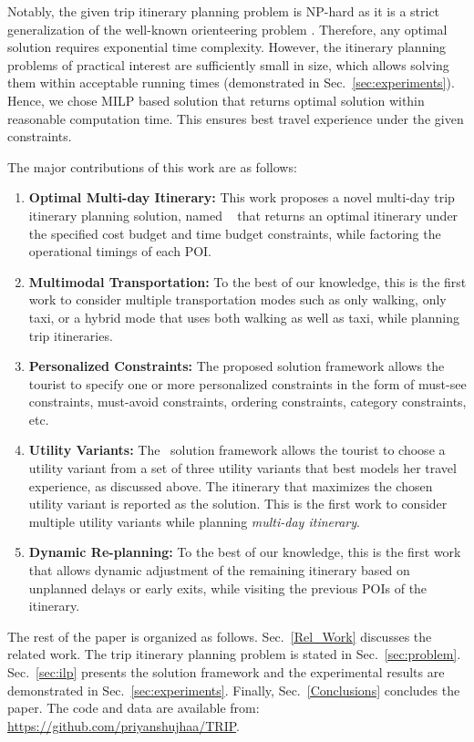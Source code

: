 Notably, the given trip itinerary planning problem is NP-hard as it is a strict generalization of the well-known orienteering problem \cite{vansteenwegen2011orienteering, gunawan2016orienteering, vansteenwegen2019orienteering}. Therefore, any optimal solution requires exponential time complexity. However, the itinerary planning problems of practical interest are sufficiently small in size, which allows solving them within acceptable running times (demonstrated in Sec.~\ref{sec:experiments}). Hence, we chose MILP based solution that returns optimal solution within reasonable computation time. This ensures best travel experience under the given constraints.

The major contributions of this work are as follows:

\begin{enumerate}
\item \textbf{Optimal Multi-day Itinerary:} This work proposes a novel multi-day trip itinerary planning solution, named \trip~ that returns an optimal itinerary under the specified cost budget and time budget constraints, while factoring the operational timings of each POI.  
\item \textbf{Multimodal Transportation:} To the best of our knowledge, this is the first work to consider multiple transportation modes such as only walking, only taxi, or a hybrid mode that uses both walking as well as taxi, while planning trip itineraries.
\item \textbf{Personalized Constraints:} The proposed solution framework allows the tourist to specify one or more personalized constraints in the form of must-see constraints, must-avoid constraints, ordering constraints, category constraints, etc.
\item \textbf{Utility Variants:} The \trip~solution framework allows the tourist to choose a utility variant from a set of three utility variants that best models her travel experience, as discussed above. The itinerary that maximizes the chosen utility variant is reported as the solution. This is the first work to consider multiple utility variants while planning \emph{multi-day itinerary}.
\item \textbf{Dynamic Re-planning:} To the best of our knowledge, this is the first work that allows dynamic adjustment of the remaining itinerary based on unplanned delays or early exits, while visiting the previous POIs of the itinerary.
%
\end{enumerate}

The rest of the paper is organized as follows. Sec.~\ref{Rel_Work}  discusses the related work. The trip itinerary planning problem is stated in Sec.~\ref{sec:problem}. Sec.~\ref{sec:ilp} presents the \trip solution framework and the experimental results are demonstrated in Sec.~\ref{sec:experiments}. Finally, Sec.~\ref{Conclusions} concludes the paper.
The code and data are available from: \url{https://github.com/priyanshujhaa/TRIP}.

